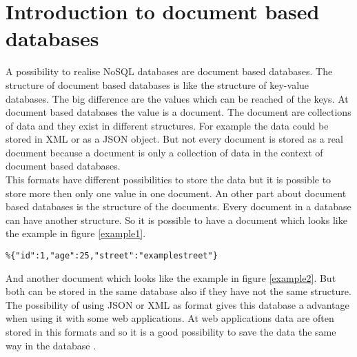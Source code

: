 \section{Introduction to document based databases}
A possibility to realise NoSQL databases are document based databases. The structure of document based databases is like the structure of key-value databases. The big difference are the values which can be reached of the keys. At document based databases the value is a document. The document are collections of data and they exist in different structures. For example the data could be stored in XML or as a JSON object. But not every document is stored as a real document because a document is only a collection of data in the context of document based databases. \\
This formats have different possibilities to store the data but it is possible to store more then only one value in one document. An other part about document based databases is the structure of the documents. Every document in a database can have another structure. 
So it is possible to have a document which looks like the example in figure \ref{example1}.

\begin{lstlisting}[frame=single, caption=Example]
%\begin{mylisting}{\label{example1} Example of an document}
%{"id":1,"age":25,"street":"examplestreet"}
\end{lstlisting}
And another document which looks like the example in figure \ref{example2}. 
%
But both can be stored in the same database also if they have not the same structure. 
The possibility of using JSON or XML as format gives this database a advantage when using it with some web applications. At web applications data are often stored in this formats and so it is a good possibility to save the data the same way in the database \cite{DocDBIntro1,DocDBIntro2,DocDBIntro3}.
